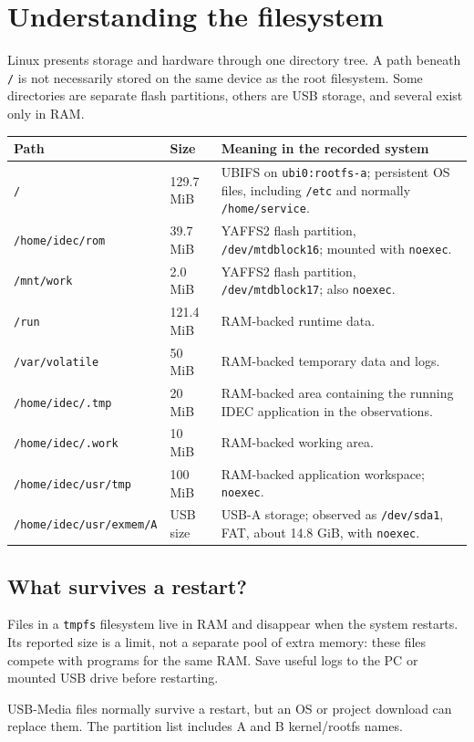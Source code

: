 \documentclass[10pt,letterpaper]{article}
\newcommand{\file}[1]{\nolinkurl{#1}}
\begin{document}
\newpage
\section{Understanding the filesystem}\label{fs}
Linux presents storage and hardware through one directory tree. A path beneath
\file{/} is not necessarily stored on the same device as the root filesystem.
Some directories are separate flash partitions, others are USB storage, and
several exist only in RAM.

\begin{tabularx}{\linewidth}{@{}p{2.05in}p{0.7in}Y@{}}
\toprule
Path & Size & Meaning in the recorded system \\
\midrule
\file{/} & 129.7 MiB & UBIFS on \file{ubi0:rootfs-a}; persistent OS files, including \file{/etc} and normally \file{/home/service}. \\
\file{/home/idec/rom} & 39.7 MiB & YAFFS2 flash partition, \file{/dev/mtdblock16}; mounted with \file{noexec}. \\
\file{/mnt/work} & 2.0 MiB & YAFFS2 flash partition, \file{/dev/mtdblock17}; also \file{noexec}. \\
\file{/run} & 121.4 MiB & RAM-backed runtime data. \\
\file{/var/volatile} & 50 MiB & RAM-backed temporary data and logs. \\
\file{/home/idec/.tmp} & 20 MiB & RAM-backed area containing the running IDEC application in the observations. \\
\file{/home/idec/.work} & 10 MiB & RAM-backed working area. \\
\file{/home/idec/usr/tmp} & 100 MiB & RAM-backed application workspace; \file{noexec}. \\
\file{/home/idec/usr/exmem/A} & USB size & USB-A storage; observed as \file{/dev/sda1}, FAT, about 14.8 GiB, with \file{noexec}. \\
\bottomrule
\end{tabularx}

\subsection{What survives a restart?}
Files in a \file{tmpfs} filesystem live in RAM and disappear when the system
restarts. Its reported size is a limit, not a separate pool of extra memory:
these files compete with programs for the same RAM. Save useful logs to the PC
or mounted USB drive before restarting.

USB-Media files normally survive a restart, but an OS or project download
can replace them. The partition list includes A and B kernel/rootfs names.
\end{document}
